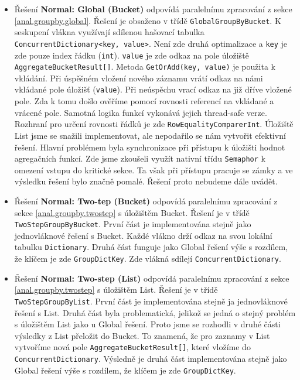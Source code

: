 \begin{itemize}
\item Řešení \textbf{Normal: Global (Bucket)} odpovídá paralelnímu zpracování z sekce \ref{anal.groupby.global}.
Řešení je obsaženo v třídě \texttt{GlobalGroupByBucket}.
K seskupení vlákna využívají sdílenou hašovací tabulka \texttt{ConcurrentDictionary<key, value>}.
Není zde druhá optimalizace a \texttt{key} je zde pouze index řádku (\texttt{int}). 
\texttt{value} je zde odkaz na pole úložiště \texttt{AggregateBucketResult[]}.
Metoda \texttt{GetOrAdd(key, value)} je použita k vkládání.
Při úspěšném vložení nového záznamu vrátí odkaz na námi vkládané pole úložišť (\texttt{value}).
Při neúspěchu vrací odkaz na již dříve vložené pole.
Zda k tomu došlo ověříme pomocí rovnosti referencí na vkládané a vrácené pole. 
Samotná logika funkcí vykonává jejich thread-safe verze. 
Rozhraní pro určení rovnosti řádků je zde \texttt{RowEqualityComparerInt}.
Úložiště List jsme se snažili implementovat, ale nepodařilo se nám vytvořit efektivní řešení.
Hlavní problémem byla synchronizace při přístupu k úložišti hodnot agregačních funkcí.
Zde jsme zkoušeli využít nativní třídu \texttt{Semaphor} k omezení vstupu do kritické sekce.
Ta však při přístupu pracuje se zámky a ve výsledku řešení bylo značně pomalé.
Řešení proto nebudeme dále uvádět.

\item Řešení \textbf{Normal: Two-tep (Bucket)} odpovídá paralelnímu zpracování z sekce \ref{anal.groupby.twostep} s úložištěm Bucket.
Řešení je v třídě \texttt{TwoStepGroupByBucket}.
První část je implementována stejně jako jednovláknové řešení s Bucket.
Každé vlákno drží odkaz na svou lokální tabulku \texttt{Dictionary}.
Druhá část funguje jako Global řešení výše s rozdílem, že klíčem je zde \texttt{GroupDictKey}.
Zde vlákná sdílejí \texttt{ConcurrentDictionary}.

\item Řešení \textbf{Normal: Two-step (List) }odpovídá paralelnímu zpracování z sekce \ref{anal.groupby.twostep} s úložištěm List.
Řešení je v třídě \texttt{TwoStepGroupByList}.
První část je implementována stejně ja jednovláknové řešení s List.
Druhá část byla problematická, jelikož se jedná o stejný problém s úložištěm List jako u Global řešení.
Proto jsme se rozhodli v druhé části výsledky z List přeložit do Bucket.
To znamená, že pro zaznamy v List vytvoříme nová pole \texttt{AggregateBucketResult[]}, které vložíme do \texttt{ConcurrentDictionary}.
Výsledně je druhá část implementována stejně jako Global řešení výše s rozdílem, že klíčem je zde \texttt{GroupDictKey}.


\end{itemize}
